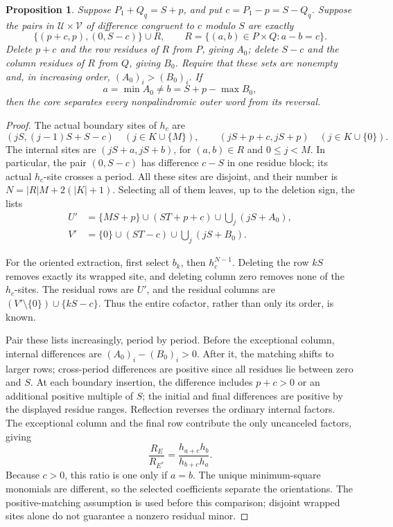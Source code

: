 \documentclass[11pt,a4paper]{amsart}
\numberwithin{equation}{section}
\theoremstyle{plain}
\newtheorem{proposition}[theorem]{Proposition}
\theoremstyle{definition}
\begin{document}
\begin{proposition}\label{prop:wrapped-selection}
Suppose \(P_1+Q_q=S+p\), and put \(c=P_1-p=S-Q_q\).  Suppose the pairs in \(\mathcal U\times\mathcal V\) of difference congruent to \(c\) modulo \(S\) are exactly
\begin{equation}\label{eq:wrapped-sites}
 \{(p+c,p),(0,S-c)\}\cup R,\qquad
 R=\{(a,b)\in P\times Q:a-b=c\}.
\end{equation}
Delete \(p+c\) and the row residues of \(R\) from \(P\), giving \(A_0\); delete \(S-c\) and the column residues of \(R\) from \(Q\), giving \(B_0\).  Require that these sets are nonempty and, in increasing order, \((A_0)_i>(B_0)_i\).  If
\[
 a=\min A_0\ne b=S+p-\max B_0,
\]
then the core separates every nonpalindromic outer word from its reversal.
\end{proposition}
\begin{proof}
The actual boundary sites of \(h_c\) are
\[
 (jS,(j-1)S+S-c)\quad(j\in K\cup\{M\}),\qquad
 (jS+p+c,jS+p)\quad(j\in K\cup\{0\}).
\]
The internal sites are \((jS+a,jS+b)\), for \((a,b)\in R\) and \(0\le j<M\).  In particular, the pair \((0,S-c)\) has difference \(c-S\) in one residue block; its actual \(h_c\)-site crosses a period.  All these sites are disjoint, and their number is \(N=|R|M+2(|K|+1)\).  Selecting all of them leaves, up to the deletion sign, the lists
\begin{equation}\label{eq:wrapped-deletion}
 \begin{aligned}
 U'&=\{MS+p\}\cup(ST+p+c)\cup\bigcup_j(jS+A_0),\\
 V'&=\{0\}\cup(ST-c)\cup\bigcup_j(jS+B_0).
 \end{aligned}
\end{equation}

For the oriented extraction, first select \(b_k\), then \(h_c^{N-1}\).  Deleting the row \(kS\) removes exactly its wrapped site, and deleting column zero removes none of the \(h_c\)-sites.  The residual rows are \(U'\), and the residual columns are
\((V'\setminus\{0\})\cup\{kS-c\}\).  Thus the entire cofactor, rather than only its order, is known.

Pair these lists increasingly, period by period.  Before the exceptional column, internal differences are \((A_0)_i-(B_0)_i>0\).  After it, the matching shifts to larger rows; cross-period differences are positive since all residues lie between zero and \(S\).  At each boundary insertion, the difference includes \(p+c>0\) or an additional positive multiple of \(S\); the initial and final differences are positive by the displayed residue ranges.  Reflection reverses the ordinary internal factors.  The exceptional column and the final row contribute the only uncanceled factors, giving
\begin{equation}\label{eq:wrapped-ratio}
 \frac{R_E}{R_{E^*}}=\frac{h_{a+c}h_b}{h_{b+c}h_a}.
\end{equation}
Because \(c>0\), this ratio is one only if \(a=b\).  The unique minimum-square monomials are different, so the selected coefficients separate the orientations.  The positive-matching assumption is used before this comparison; disjoint wrapped sites alone do not guarantee a nonzero residual minor.
\end{proof}
\end{document}

